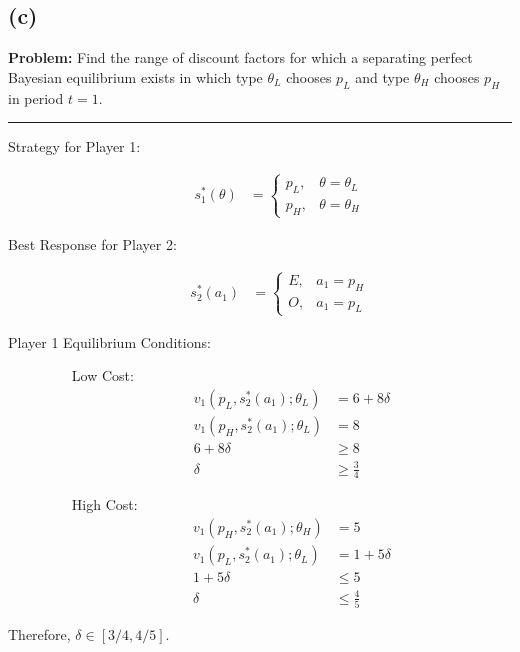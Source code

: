 \documentclass[10pt]{extarticle}
\begin{document}
    \subsection{(c)}%
    \textbf{Problem:} Find the range of discount factors for which a separating perfect Bayesian equilibrium exists in which type $\theta_L$ chooses $p_L$ and type $\theta_H$ chooses $p_H$ in period $t=1$.
    \begin{center}
    \rule{\textwidth}{0.4pt}
    \end{center}
    \begin{description}
      \item[Strategy for Player 1:]
        \begin{align*}
          s_1^{\ast}(\theta) &= \begin{cases}
            p_L,&\theta = \theta_L\\
            p_H,&\theta=\theta_H
          \end{cases}
        \end{align*}
      \item[Best Response for Player 2:]
        \begin{align*}
          s_2^{\ast}(a_1) &= \begin{cases}
            E,&a_1 = p_H\\
            O,&a_1=p_L
          \end{cases}
        \end{align*}
      \item[Player 1 Equilibrium Conditions:]\hfill
        \begin{itemize}
          \item[Low Cost:]
            \begin{align*}
              v_1(p_L,s_2^{\ast}(a_1);\theta_L) &= 6 + 8\delta\\
              v_1(p_H,s_2^{\ast}(a_1);\theta_L) &= 8\\
              6 + 8\delta &\geq 8\\
              \delta &\geq \frac{3}{4}
            \end{align*}
          \item[High Cost:]
            \begin{align*}
              v_1(p_H,s_2^{\ast}(a_1);\theta_H) &= 5\\
              v_1(p_L,s_2^{\ast}(a_1);\theta_L) &= 1 + 5\delta\\
              1 + 5\delta &\leq 5\\
              \delta &\leq \frac{4}{5}
            \end{align*}
        \end{itemize}
    \end{description}
    Therefore, $\delta \in [3/4,4/5]$.
    \pagebreak
\end{document}
